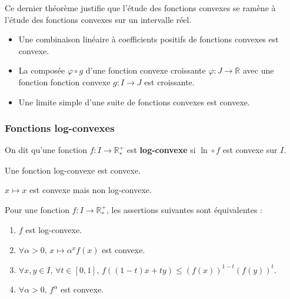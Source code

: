   Ce dernier théorème justifie que l'étude des fonctions convexes se ramène à l'étude des fonctions convexes sur un intervalle réel.

  \begin{proposition}
    \begin{itemize}
      \item Une combinaison linéaire à coefficients positifs de fonctions convexes est convexe.
      \item La composée $\varphi \circ g$ d'une fonction convexe croissante $\varphi : J \rightarrow \mathbb{R}$ avec une fonction fonction convexe $g : I \rightarrow J$ est croissante.
      \item Une limite simple d'une suite de fonctions convexes est convexe.
    \end{itemize}
  \end{proposition}

  \subsubsection{Fonctions log-convexes}


  \begin{definition}
    On dit qu'une fonction $f : I \rightarrow \mathbb{R}^+_*$ est \textbf{log-convexe} si $\ln \circ f$ est convexe sur $I$.
  \end{definition}

  \begin{proposition}
    Une fonction log-convexe est convexe.
  \end{proposition}

  \begin{cexample}
    $x \mapsto x$ est convexe mais non log-convexe.
  \end{cexample}

  \begin{theorem}
    Pour une fonction $f : I \rightarrow \mathbb{R}^+_*$, les assertions suivantes sont équivalentes :
    \begin{enumerate}[label=(\roman*)]
      \item $f$ est log-convexe.
      \item $\forall \alpha > 0, \, x \mapsto \alpha^x f(x)$ est convexe.
      \item $\forall x, y \in I, \, \forall t \in [0,1], \, f((1-t)x + ty) \leq (f(x))^{1-t} (f(y))^t$.
      \item $\forall \alpha > 0, \, f^\alpha$ est convexe.
    \end{enumerate}
  \end{theorem}

